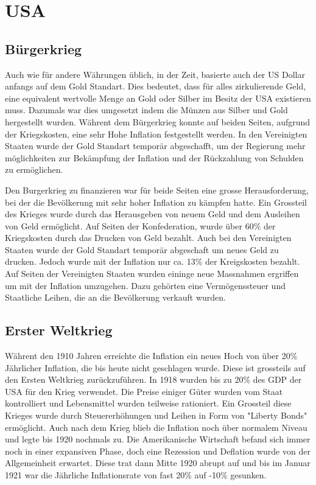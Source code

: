 \section{USA}


\subsection{Bürgerkrieg}
Auch wie für andere Währungen üblich, in der Zeit, basierte auch der US Dollar anfangs auf dem Gold Standart.
Dies bedeutet, dass für alles zirkulierende Geld, eine equivalent wertvolle Menge an Gold oder Silber im Besitz der USA existieren muss.
Dazumals war dies umgesetzt indem die Münzen aus Silber und Gold hergestellt wurden. %
Währent dem Bürgerkrieg konnte auf beiden Seiten, aufgrund der Kriegskosten, eine sehr Hohe Inflation festgestellt werden.
In den Vereinigten Staaten wurde der Gold Standart temporär abgeschafft, um der Regierung mehr möglichkeiten zur Bekämpfung der Inflation und der Rückzahlung von Schulden zu ermöglichen.

Den Burgerkrieg zu finanzieren war für beide Seiten eine grosse Herausforderung, bei der die Bevölkerung mit sehr hoher Inflation zu kämpfen hatte.
Ein Grossteil des Krieges wurde durch das Herausgeben von neuem Geld und dem Ausleihen von Geld ermöglicht.
Auf Seiten der Konfederation, wurde über 60\% der Kriegskosten durch das Drucken von Geld bezahlt.
Auch bei den Vereinigten Staaten wurde der Gold Standart temporär abgeschaft um neues Geld zu drucken.
Jedoch wurde mit der Inflation nur ca. 13\% der Kreigskosten bezahlt.
Auf Seiten der Vereinigten Staaten wurden eininge neue Massnahmen ergriffen um mit der Inflation umzugehen.
Dazu gehörten eine Vermögenssteuer und Staatliche Leihen, die an die Bevölkerung verkauft wurden.


\subsection{Erster Weltkrieg}
Währent den 1910 Jahren erreichte die Inflation ein neues Hoch von über 20\% Jährlicher Inflation, die bis heute nicht geschlagen wurde.
Diese ist grossteils auf den Ersten Weltkrieg zurückzuführen.
In 1918 wurden bis zu 20\% des GDP der USA für den Krieg verwendet.
Die Preise einiger Güter wurden vom Staat kontrolliert und Lebensmittel wurden teilweise rationiert.
Ein Grossteil diese Krieges wurde durch Steuererhöhungen und Leihen in Form von "Liberty Bonds" ermöglicht.
Auch nach dem Krieg blieb die Inflation noch über normalem Niveau und legte bis 1920 nochmals zu.
Die Amerikanische Wirtschaft befand sich immer noch in einer expansiven Phase, doch eine Rezession und Deflation wurde von der Allgemeinheit erwartet.
Diese trat dann Mitte 1920 abrupt auf und bis im Januar 1921 war die Jährliche Inflationsrate von fast 20\% auf -10\% gesunken.

